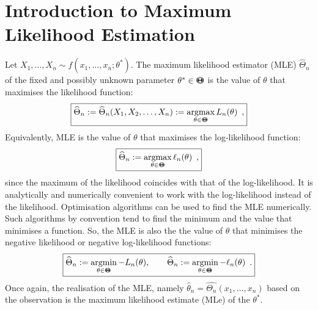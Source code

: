 \section{Introduction to Maximum Likelihood Estimation}\label{S:MLE}
\begin{definition}\label{D:MLE}
Let $X_1,\ldots,X_n \sim f(x_1,\ldots,x_n;\theta^*)$.  The maximum likelihood estimator (MLE) $\widehat{\Theta}_n$ of the fixed and possibly unknown parameter $\theta^* \in {\Theta}\mspace{-11 mu}{\Theta}$ is the value of $\theta$ that maximises the likelihood function:
\[
\boxed{
\widehat{\Theta}_n := \widehat{\Theta}_n(X_1,X_2,\ldots,X_n) :=  \mathop{\rm argmax}_{\theta \in {\Theta}\mspace{-11 mu}{\Theta}} L_n(\theta) \enspace ,
}
\]
Equivalently, MLE is the value of $\theta$ that maximises the log-likelihood function:
\[
\boxed{
\widehat{\Theta}_n := \mathop{\rm argmax}_{\theta \in {\Theta}\mspace{-11 mu}{\Theta}} \ell_n(\theta) \enspace ,
}
\]
since the maximum of the likelihood coincides with that of the log-likelihood.  It is analytically and numerically convenient to work with the log-likelihood instead of the likelihood.  Optimisation algorithms can be used to find the MLE numerically.  Such algorithms by convention tend to find the minimum and the value that minimises a function.  So, the MLE is also the the value of $\theta$ that minimises the negative likelihood or negative log-likelihood functions:
\[
\boxed{
\widehat{\Theta}_n := \mathop{\rm argmin}_{\theta \in {\Theta}\mspace{-11 mu}{\Theta}} -L_n(\theta), \qquad
\widehat{\Theta}_n := \mathop{\rm argmin}_{\theta \in {\Theta}\mspace{-11 mu}{\Theta}} -\ell_n(\theta)  \enspace .
}
\]
Once again, the realisation of the MLE, namely $\widehat{\theta}_n = \widehat{\Theta_n}(x_1,\ldots,x_n)$ based on the observation is the maximum likelihood estimate (MLe) of the $\theta^*$.
\end{definition}

